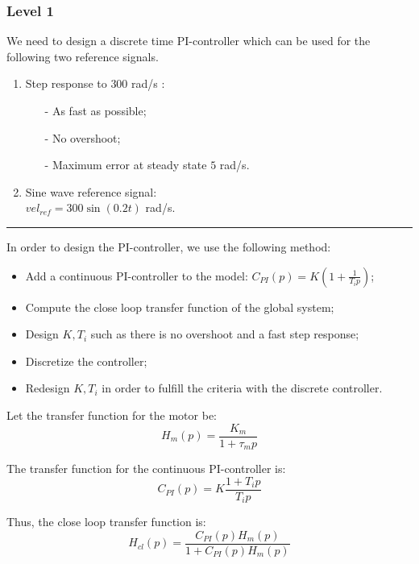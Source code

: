 
\subsubsection*{Level 1}

We need to design a discrete time PI-controller which can be used for the following two reference signals.

\begin{enumerate}
 \item Step response to $300$ rad/s :
 \begin{itemize}
  \item[-] As fast as possible;
  \item[-] No overshoot;
  \item[-] Maximum error at steady state $5$ rad/s.
 \end{itemize}
  \item Sine wave reference signal: \\ $vel_{ref} = 300 \sin(0.2t)$ rad/s.
\end{enumerate}

\begin{center} \noindent\rule{6cm}{0.1pt} \end{center}


In order to design the PI-controller, we use the following method:
\begin{itemize}
 \item Add a continuous PI-controller to the model: $C_{PI}(p) = K(1 + \frac{1}{T_i p})$;
 \item Compute the close loop transfer function of the global system;
 \item Design $K,T_i$ such as there is no overshoot and a fast step response;
 \item Discretize the controller;
 \item Redesign $K,T_i$ in order to fulfill the criteria with the discrete controller.
\end{itemize}

Let the transfer function for the motor be: $$H_{m}(p) = \frac{K_{m}}{1 + \tau_{m} p}$$

The transfer function for the continuous PI-controller is: $$C_{PI}(p) = K\frac{1 + T_i p}{T_i p}$$

Thus, the close loop transfer function is: \begin{equation} \label{eq1} H_{cl}(p) = \frac{C_{PI}(p) H_{m}(p)}{1 + C_{PI}(p) H_{m}(p)} \end{equation}

